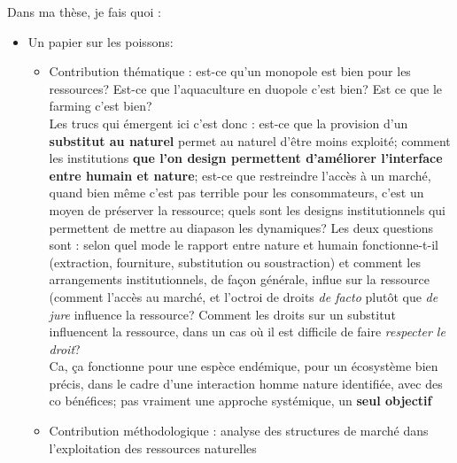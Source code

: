 Dans ma thèse, je fais quoi : 
\begin{itemize}
\item Un papier sur les poissons:
\begin{itemize}
\item Contribution thématique : est-ce qu'un monopole est bien pour les ressources? Est-ce que l'aquaculture en duopole c'est bien? Est ce que le farming c'est bien? 
\\
Les trucs qui émergent ici c'est donc : est-ce que la provision d'un\textbf{ substitut au naturel} permet au naturel d'être moins exploité; comment les institutions \textbf{que l'on design permettent d'améliorer l'interface entre humain et nature}; est-ce que restreindre l'accès à un marché, quand bien même c'est pas terrible pour les consommateurs, c'est un moyen de préserver la ressource; quels sont les designs institutionnels qui permettent de mettre au diapason les dynamiques? Les deux questions sont : selon quel mode le rapport entre nature et humain fonctionne-t-il (extraction, fourniture, substitution ou soustraction) et comment les arrangements institutionnels, de façon générale, influe sur la ressource (comment l'accès au marché, et l'octroi de droits \textit{de facto} plutôt que \textit{de jure} influence la ressource? Comment les droits sur un substitut influencent la ressource, dans un cas où il est difficile de faire \textit{respecter le droit}?
\\
Ca, ça fonctionne pour une espèce endémique, pour un écosystème bien précis, dans le cadre d'une interaction homme nature identifiée, avec des co bénéfices; pas vraiment une approche systémique, un \textbf{seul objectif}
\item Contribution méthodologique : analyse des structures de marché dans l'exploitation des ressources naturelles
\end{itemize}


\end{itemize}
